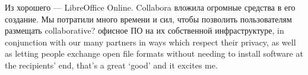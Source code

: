 \documentclass[10pt, a5paper]{article}
\begin{document}
\begin{Parallel}[p]{}{}
{Из хорошего — LibreOffice Online. Collabora вложила огромные средства в его создание. Мы потратили много времени и сил, чтобы позволить пользователям размещать {\color{red} collaborative? офисное ПО на их собственной инфраструктуре, in conjunction with our many partners in ways which respect their privacy, as well as letting people exchange open file formats without needing to install software at the recipients' end, that's a great ‘good’ and it excites me.}


     }
   \end{Parallel}









 
\end{document}
